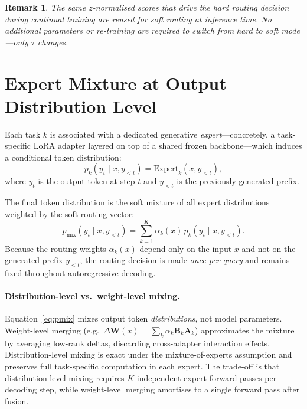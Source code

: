 \documentclass[12pt,a4paper]{article}
\newtheorem{remark}{Remark}
\begin{document}
\begin{remark}
The same $z$-normalised scores that drive the hard routing decision during continual training are reused for soft routing at inference time.
No additional parameters or re-training are required to switch from hard to soft mode---only $\tau$ changes.
\end{remark}

\section{Expert Mixture at Output Distribution Level}
\label{sec:expert_mix}

Each task $k$ is associated with a dedicated generative \emph{expert}---concretely, a task-specific LoRA adapter layered on top of a shared frozen backbone---which induces a conditional token distribution:
\begin{equation}
    p_k(y_t \mid x, y_{<t}) = \mathrm{Expert}_k(x, y_{<t}),
    \label{eq:pk}
\end{equation}
where $y_t$ is the output token at step $t$ and $y_{<t}$ is the previously generated prefix.

The final token distribution is the soft mixture of all expert distributions weighted by the soft routing vector:
\begin{equation}
    p_{\mathrm{mix}}(y_t \mid x, y_{<t}) = \sum_{k=1}^K \alpha_k(x)\, p_k(y_t \mid x, y_{<t}).
    \label{eq:pmix}
\end{equation}
Because the routing weights $\alpha_k(x)$ depend only on the input $x$ and not on the generated prefix $y_{<t}$, the routing decision is made \emph{once per query} and remains fixed throughout autoregressive decoding.

\paragraph{Distribution-level vs.\ weight-level mixing.}
Equation~\eqref{eq:pmix} mixes output token \emph{distributions}, not model parameters.
Weight-level merging (e.g.\ $\Delta\mathbf{W}(x)=\sum_k\alpha_k\mathbf{B}_k\mathbf{A}_k$) approximates the mixture by averaging low-rank deltas, discarding cross-adapter interaction effects.
Distribution-level mixing is exact under the mixture-of-experts assumption and preserves full task-specific computation in each expert.
The trade-off is that distribution-level mixing requires $K$ independent expert forward passes per decoding step, while weight-level merging amortises to a single forward pass after fusion.
\end{document}
